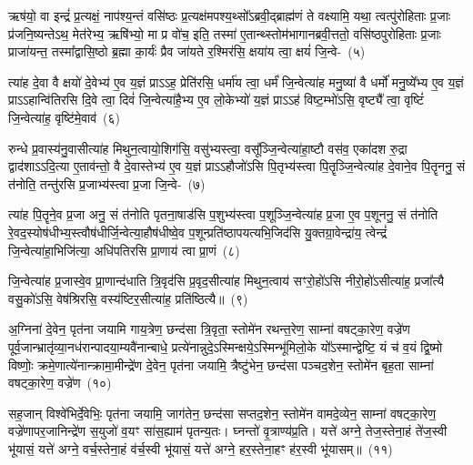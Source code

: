 {}%

ऋष॑यो॒ वा इन्द्रं॑ प्र॒त्यक्षं॒ नाप॑श्य॒न्तं वसि॑ष्ठः प्र॒त्यक्ष॑मपश्य॒थ्सो᳚\-ऽब्रवी॒द्ब्राह्म॑णं ते वक्ष्यामि॒ यथा॒ त्वत्पु॑रोहिताः प्र॒जाः प्र॑जनि॒ष्यन्ते\-ऽथ॒ मेत॑रेभ्य॒ ऋषि॑भ्यो॒ मा प्र वो॑च॒ इति॒ तस्मा॑ ए॒तान्थ्स्तोम॑भागानब्रवी॒त्ततो॒ वसि॑ष्ठपुरोहिताः प्र॒जाः प्राजा॑यन्त॒ तस्मा᳚द्वासि॒ष्ठो ब्र॒ह्मा का॒र्यः॑ प्रैव जा॑यते र॒श्मिर॑सि॒ क्षया॑य त्वा॒ क्षयं॑ जि॒न्वे-~(५)

त्या॑ह दे॒वा वै क्षयो॑ दे॒वेभ्य॑ ए॒व य॒ज्ञं प्रा\-ऽऽ\-ह॒ प्रेति॑रसि॒ धर्मा॑य त्वा॒ धर्मं॑ जि॒न्वेत्या॑ह मनु॒ष्या॑ वै धर्मो॑ मनु॒ष्ये᳚भ्य ए॒व य॒ज्ञं प्रा\-ऽऽ\-हान्वि॑तिरसि दि॒वे त्वा॒ दिवं॑ जि॒न्वेत्या॑है॒भ्य ए॒व लो॒केभ्यो॑ य॒ज्ञं प्रा\-ऽऽ\-ह॑ विष्ट॒म्भो॑\-ऽसि॒ वृष्ट्यै᳚ त्वा॒ वृष्टिं॑ जि॒न्वेत्या॑ह॒ वृष्टि॑मे॒वाव॑~(६)

रुन्धे प्र॒वास्य॑नु॒वासीत्या॑ह मिथुन॒त्वायो॒शिग॑सि॒ वसु॑भ्यस्त्वा॒ वसू᳚ञ्जि॒न्वेत्या॑हा॒ष्टौ वस॑व॒ एका॑\-दश रु॒द्रा द्वाद॑शा\-ऽऽ\-दि॒त्या ए॒ताव॑न्तो॒ वै दे॒वास्तेभ्य॑ ए॒व य॒ज्ञं प्रा\-ऽऽ\-हौजो॑\-ऽसि पि॒तृभ्य॑स्त्वा पि॒तॄञ्जि॒न्वेत्या॑ह दे॒वाने॒व पि॒तॄननु॒ सं त॑नोति॒ तन्तु॑रसि प्र॒जाभ्य॑स्त्वा प्र॒जा \mbox{जि॒न्वे-~(७)}

त्या॑ह पि॒तॄने॒व प्र॒जा अनु॒ सं त॑नोति पृतना॒षाड॑सि प॒शुभ्य॑स्त्वा प॒शूञ्जि॒न्वेत्या॑ह प्र॒जा ए॒व प॒शूननु॒ सं त॑नोति रे॒वद॒स्योष॑धीभ्य॒स्त्वौष॑धीर्जि॒न्वेत्या॒\-हौष॑धीष्वे॒व प॒शून्प्रति॑\-ष्ठापयत्यभि॒\-जिद॑सि यु॒क्तग्रा॒वेन्द्रा॑य॒ त्वेन्द्रं॑ जि॒न्वेत्या॑हा॒भिजि॑त्या॒ अधि॑\-पतिरसि प्रा॒णाय॑ त्वा प्रा॒णं~(८)

जि॒न्वेत्या॑ह प्र॒जास्वे॒व प्रा॒णान्द॑धाति त्रि॒वृद॑सि प्र॒वृद॒सीत्या॑ह मिथुन॒त्वाय॑ सꣳरो॒हो॑\-ऽसि नीरो॒हो॑\-ऽसीत्या॑ह॒ प्रजा᳚त्यै वसु॒को॑\-ऽसि॒ वेष॑श्रिरसि॒ वस्य॑ष्टिर॒सीत्या॑ह॒ प्रति॑ष्ठित्यै॥~(९)

{\anuvakamend[{जि॒न्वेत्यव॑ प्र॒जा जि॑न्व प्रा॒णन्त्रि॒ꣳ॒शच्च॑}]}%

अ॒ग्निना॑ दे॒वेन॒ पृत॑ना जयामि गाय॒त्रेण॒ छन्द॑सा त्रि॒वृता॒ स्तोमे॑न रथन्त॒रेण॒ साम्ना॑ वषट्का॒रेण॒ वज्रे॑ण पूर्व॒जान्भ्रातृ॑व्या॒नध॑रान्पादया॒म्यवै॑\-नान्बाधे॒ प्रत्ये॑नान्नुदे॒\-ऽस्मिन्क्षये॒\-ऽस्मिन्भू॑मिलो॒के यो᳚\-ऽस्मान्द्वेष्टि॒ यं च॑ व॒यं द्वि॒ष्मो विष्णोः॒ क्रमे॒णात्ये॑नान्क्रामा॒मीन्द्रे॑ण दे॒वेन॒ पृत॑ना जयामि॒ त्रैष्टु॑भेन॒ छन्द॑सा पञ्चद॒शेन॒ स्तोमे॑न बृह॒ता साम्ना॑ वषट्का॒रेण॒ वज्रे॑ण~(१०)

सह॒जान् विश्वे॑भिर्दे॒वेभिः॒ पृत॑ना जयामि॒ जाग॑तेन॒ छन्द॑सा सप्तद॒शेन॒ स्तोमे॑न वामदे॒व्येन॒ साम्ना॑ वषट्का॒रेण॒ वज्रे॑णापर॒जानिन्द्रे॑ण स॒युजो॑ व॒यꣳ सा॑स॒ह्याम॑ पृतन्य॒तः। घ्नन्तो॑ वृ॒त्राण्य॑प्र॒ति। यत्ते॑ अग्ने॒ तेज॒स्तेना॒हं ते॑ज॒स्वी भू॑यासं॒ यत्ते॑ अग्ने॒ वर्च॒स्तेना॒हं व॑र्च॒स्वी भू॑यासं॒ यत्ते॑ अग्ने॒ हर॒स्तेना॒हꣳ ह॑र॒स्वी भू॑यासम्॥~(११)

